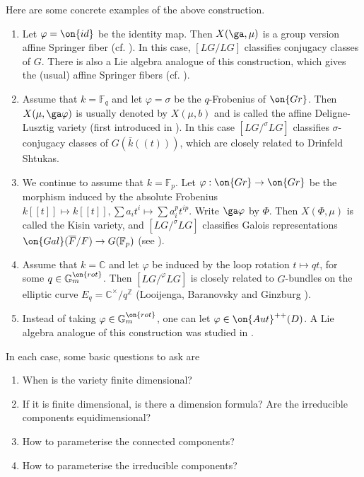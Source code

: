 \documentclass[]{pcmi}
\theoremstyle{plain}
\theoremstyle{remark}
\theoremstyle{definition}
\newcommand{\bC}{{\mathbb C}}
\newcommand{\bF}{{\mathbb F}}
\newcommand{\bG}{{\mathbb G}}
\newcommand{\bZ}{{\mathbb Z}}
\newcommand{\Aut}{{\on{Aut}}}
\newcommand{\Gal}{{\on{Gal}}}
\newcommand{\Gr}{{\on{Gr}}}
\newcommand{\id}{{\on{id}}}
\begin{document}
Here are some concrete examples of the above construction.
\begin{enumerate}
\item[(i)] Let $\varphi=\id$ be the identity map. Then $X(\ga,\mu)$ is a group version affine Springer fiber (cf. \cite[\S~2.7.3]{Yu}). In this case, $[LG/LG]$ classifies conjugacy classes of $G$. There is also a Lie algebra analogue of this construction, which gives the (usual) affine Springer fibers (cf. \cite[\S~2.2]{Yu}).

\item[(ii)] Assume that $k=\bF_q$ and let $\varphi=\sigma$ be the $q$-Frobenius of $\Gr$. Then $X(\mu,\ga\varphi)$ is usually denoted by $X(\mu,b)$ and is called the affine Deligne-Lusztig variety (first introduced in \cite{Ra}). In this case $[LG/^{\sigma}LG]$ classifies $\sigma$-conjugacy classes of $G(\bar{k}((t)))$, which are closely related to Drinfeld Shtukas.


\item[(iii)] We continue to assume that $k=\bF_p$. Let $\varphi:\Gr\to \Gr$ be the morphism induced by the absolute Frobenius $k[[t]]\mapsto k[[t]], \sum a_it^i\mapsto \sum a_i^pt^{ip}$. Write $\ga\varphi$ by $\Phi$. Then $X(\Phi,\mu)$ is called the Kisin variety, and  $[LG/^{\sigma}LG]$ classifies Galois representations $\Gal(\overline F/ F)\to G(\bF_p)$ (see \cite{PR2}). 

\item[(iv)] Assume that $k=\bC$ and let $\varphi$ be induced by the loop rotation $t\mapsto qt$, for some $q\in \bG_m^{\on{rot}}$. Then $[LG/^{\varphi}LG]$ is closely related to $G$-bundles on the elliptic curve $E_q=\bC^\times/q^\bZ$ (Looijenga, Baranovsky and Ginzburg \cite{BG}).

\item[(v)] Instead of taking $\varphi\in \bG_m^{\on{rot}}$, one can let $\varphi\in \Aut^{++}(D)$. A Lie algebra analogue of  this construction was studied in \cite{FZ}.
\end{enumerate}


In each case, some basic questions to ask are
\begin{enumerate}
\item When is the variety finite dimensional?
\item If it is finite dimensional, is there a dimension formula? Are the irreducible components equidimensional?
\item How to parameterise the connected components? 
\item How to parameterise the irreducible components?
\end{enumerate}
\end{document}
